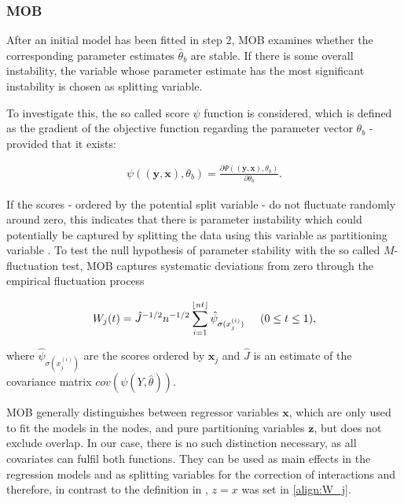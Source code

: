 \subsubsection{MOB}
After an initial model has been fitted in step 2, MOB examines whether the corresponding parameter estimates $\hat{\theta}_b$ are stable. If there is some overall instability, the variable whose parameter estimate has the most significant instability is chosen as splitting variable.

To investigate this, the so called score $\psi$ function is considered, which is defined as the
gradient of the objective function regarding the parameter vector $\theta_b$ - provided that it exists:

\begin{align}
    \psi \left( \left(\mathbf{y}, \mathbf{x} \right), \theta_b \right) = \frac{\partial \Psi\left( \left(\mathbf{y}, \mathbf{x} \right), \theta_b \right)}{\partial \theta_b}.
\end{align}

\citep{Zeileis.2008}

If the scores - ordered by the potential split variable - do not fluctuate randomly around zero, this indicates that there is parameter instability which could potentially be captured by splitting the data using this variable as partitioning variable \citep{Schlosser.2019}.
To test the null hypothesis of parameter stability with the so called $M$-fluctuation test, MOB captures systematic deviations from zero through the empirical fluctuation process

\begin{align}\label{align:W_j}
    W_{j}(t) = \hat{J}^{-1/2}n^{-1/2}\sum_{i = 1}^{\lfloor nt \rfloor} \hat{\psi}_{\sigma(x_{j}^{(i)})} \hspace{0.5cm} (0 \leq t \leq 1), 
\end{align}

where $\hat{\psi}_{\sigma(x_{j}^{(i)})}$ are the scores ordered by $\mathbf{x}_{j}$ and $\hat{J}$ is an estimate of the covariance matrix $cov(\psi(Y, \hat{\theta}))$. \citep{Zeileis.2008}

MOB generally distinguishes between regressor variables $\mathbf{x}$, which are only used to fit the models in the nodes, and pure partitioning variables $\mathbf{z}$, but does not exclude overlap. In our case, there is no such distinction necessary, as all covariates can fulfil both functions.  They can be used as main effects in the regression models and as splitting variables for the correction of interactions and therefore, in contrast to the definition in \citep{Zeileis.2008}, $z = x$ was set in \ref{align:W_j}.


